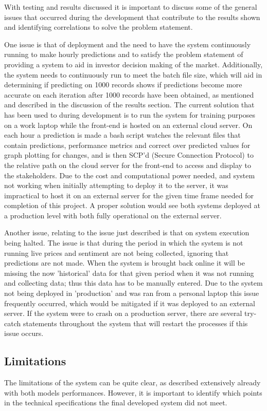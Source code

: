 \documentclass[oneside, 12pt]{article}
\begin{document}
	With testing and results discussed it is important to discuss some of the general issues that occurred during the development that contribute to the results shown and identifying correlations to solve the problem statement. 
	
	One issue is that of deployment and the need to have the system continuously running to make hourly predictions and to satisfy the problem statement of providing a system to aid in investor decision making of the market. Additionally, the system needs to continuously run to meet the batch file size, which will aid in determining if predicting on 1000 records shows if predictions become more accurate on each iteration after 1000 records have been obtained, as mentioned and described in the discussion of the results section.
	The current solution that has been used to during development is to run the system for training purposes on a work laptop while the front-end is hosted on an external cloud server. On each hour a prediction is made a bash script watches the relevant files that contain predictions, performance metrics and correct over predicted values for graph plotting for changes, and is then SCP'd (Secure Connection Protocol) to the relative path on the cloud server for the front-end to access and display to the stakeholders.
	Due to the cost and computational power needed, and system not working when initially attempting to deploy it to the server, it was impractical to host it on an external server for the given time frame needed for completion of this project.
	A proper solution would see both systems deployed at a production level with both fully operational on the external server.
	
	Another issue, relating to the issue just described is that on system execution being halted. The issue is that during the period in which the system is not running live prices and sentiment are not being collected, ignoring that predictions are not made. When the system is brought back online it will be missing the now 'historical' data for that given period when it was not running and collecting data; thus this data has to be manually entered. Due to the system not being deployed in 'production' and was ran from a personal laptop this issue frequently occurred, which would be mitigated if it was deployed to an external server. If the system were to crash on a production server, there are several try-catch statements throughout the system that will restart the processes if this issue occurs.
	
	\subsection{Limitations}
	The limitations of the system can be quite clear, as described extensively already with both models performances. However, it is important to identify which points in the technical specifications the final developed system did not meet.
	
\end{document}
